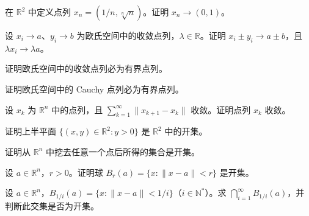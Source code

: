 \noindent\begin{minipage}{\textwidth}
在 $\mathbb R^2$ 中定义点列 $x_n=(1/n,\sqrt[n]n)$。证明 $x_n\to(0,1)$。
\end{minipage}\par\vfill
\newpage
\noindent\begin{minipage}{\textwidth}
设 $x_i\to a$、$y_i\to b$ 为欧氏空间中的收敛点列，$\lambda\in\mathbb R$。证明 $x_i\pm y_i\to a\pm b$，且 $\lambda x_i\to\lambda a$。
\end{minipage}\par\vfill
\noindent\begin{minipage}{\textwidth}
证明欧氏空间中的收敛点列必为有界点列。
\end{minipage}\par\vfill
\noindent\begin{minipage}{\textwidth}
证明欧氏空间中的 Cauchy 点列必为有界点列。
\end{minipage}\par\vfill
\newpage
\noindent\begin{minipage}{\textwidth}
设 $x_k$ 为 $\mathbb R^n$ 中的点列，且 $\sum_{k=1}^{\infty}\|x_{k+1}-x_k\|$ 收敛。证明点列 $x_k$ 收敛。
\end{minipage}\par\vfill
\noindent\begin{minipage}{\textwidth}
证明上半平面 $\{(x,y)\in\mathbb R^2:y>0\}$ 是 $\mathbb R^2$ 中的开集。
\end{minipage}\par\vfill
\noindent\begin{minipage}{\textwidth}
证明从 $\mathbb R^n$ 中挖去任意一个点后所得的集合是开集。
\end{minipage}\par\vfill
\newpage
\noindent\begin{minipage}{\textwidth}
设 $a\in\mathbb R^n$，$r>0$。证明球 $B_r(a)=\{x:\|x-a\|<r\}$ 是开集。
\end{minipage}\par\vfill
\noindent\begin{minipage}{\textwidth}
设 $a\in\mathbb R^n$，$B_{1/i}(a)=\{x:\|x-a\|<1/i\}$（$i\in\mathbb N^{*}$）。求 $\bigcap_{i=1}^{\infty}B_{1/i}(a)$，并判断此交集是否为开集。
\end{minipage}\par\vfill

